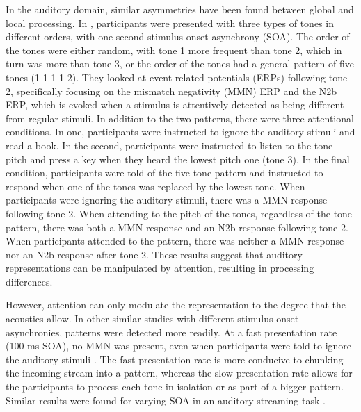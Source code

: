 In the auditory domain, similar asymmetries have been found between global and local processing.
In \citet{Sussman2002}, participants were presented with three types of tones in different orders, with one second stimulus onset asynchrony (SOA).  
The order of the tones were either random, with tone 1 more frequent than tone 2, which in turn was more than tone 3, or the order of the tones had a general pattern of five tones (1 1 1 1 2).  
They looked at event-related potentials (ERPs) following tone 2, specifically focusing on the mismatch negativity (MMN) ERP and the N2b ERP, which is evoked when a stimulus is attentively detected as being different from regular stimuli.
In addition to the two patterns, there were three attentional conditions.  
In one, participants were instructed to ignore the auditory stimuli and read a book.  
In the second, participants were instructed to listen to the tone pitch and press a key when they heard the lowest pitch one (tone 3). 
 In the final condition, participants were told of the five tone pattern and instructed to respond when one of the tones was replaced by the lowest tone.
When participants were ignoring the auditory stimuli, there was a MMN response following tone 2.  
When attending to the pitch of the tones, regardless of the tone pattern, there was both a MMN response and an N2b response following tone 2.  
When participants attended to the pattern, there was neither a MMN response nor an N2b response after tone 2.
These results suggest that auditory representations can be manipulated by attention, resulting in processing differences.

However, attention can only modulate the representation to the degree that the acoustics allow.
In other similar studies with different stimulus onset asynchronies, patterns were detected more readily.
At a fast presentation rate (100-ms SOA), no MMN was present, even when participants were told to ignore the auditory stimuli \citep{Sussman1998}.
The fast presentation rate is more conducive to chunking the incoming stream into a pattern, whereas the slow presentation rate allows for the participants to process each tone in isolation or as part of a bigger pattern.
Similar results were found for varying SOA in an auditory streaming task \citep{Sussman1998,Sussman1998a}.

